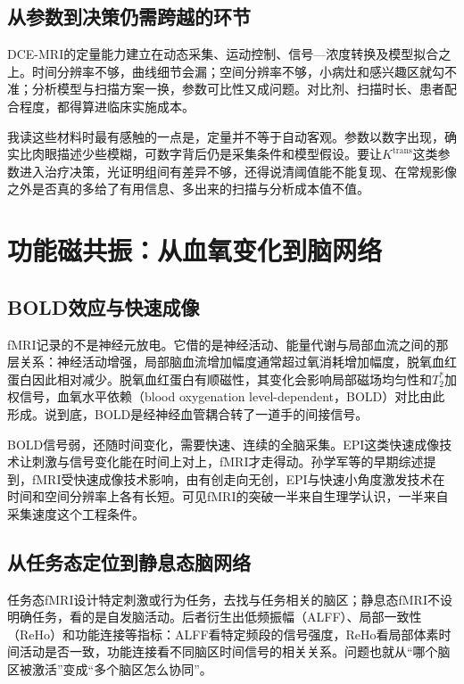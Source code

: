 \subsection{从参数到决策仍需跨越的环节}

DCE-MRI的定量能力建立在动态采集、运动控制、信号—浓度转换及模型拟合之上。时间分辨率不够，曲线细节会漏；空间分辨率不够，小病灶和感兴趣区就勾不准；分析模型与扫描方案一换，参数可比性又成问题。对比剂、扫描时长、患者配合程度，都得算进临床实施成本。

我读这些材料时最有感触的一点是，定量并不等于自动客观。参数以数字出现，确实比肉眼描述少些模糊，可数字背后仍是采集条件和模型假设。要让$K^{\mathrm{trans}}$这类参数进入治疗决策，光证明组间有差异不够，还得说清阈值能不能复现、在常规影像之外是否真的多给了有用信息、多出来的扫描与分析成本值不值。

\section{功能磁共振：从血氧变化到脑网络}

\subsection{BOLD效应与快速成像}

fMRI记录的不是神经元放电。它借的是神经活动、能量代谢与局部血流之间的那层关系：神经活动增强，局部脑血流增加幅度通常超过氧消耗增加幅度，脱氧血红蛋白因此相对减少。脱氧血红蛋白有顺磁性，其变化会影响局部磁场均匀性和$T_2^*$加权信号，血氧水平依赖（blood oxygenation level-dependent，BOLD）对比由此形成\cite{wu2024mri,sun2001fmri}。说到底，BOLD是经神经血管耦合转了一道手的间接信号。

BOLD信号弱，还随时间变化，需要快速、连续的全脑采集。EPI这类快速成像技术让刺激与信号变化能在时间上对上，fMRI才走得动。孙学军等的早期综述提到，fMRI受快速成像技术影响，由有创走向无创，EPI与快速小角度激发技术在时间和空间分辨率上各有长短\cite{sun2001fmri}。可见fMRI的突破一半来自生理学认识，一半来自采集速度这个工程条件。

\subsection{从任务态定位到静息态脑网络}

任务态fMRI设计特定刺激或行为任务，去找与任务相关的脑区；静息态fMRI不设明确任务，看的是自发脑活动。后者衍生出低频振幅（ALFF）、局部一致性（ReHo）和功能连接等指标：ALFF看特定频段的信号强度，ReHo看局部体素时间活动是否一致，功能连接看不同脑区时间信号的相关关系\cite{wu2024mri}。问题也就从“哪个脑区被激活”变成“多个脑区怎么协同”。

